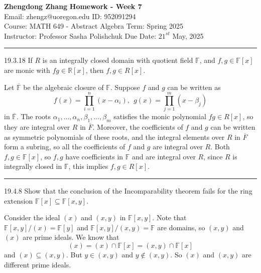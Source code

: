 \documentclass[letterpaper, 12pt]{article}
\begin{document}
\noindent
\large\textbf{Zhengdong Zhang} \hfill \textbf{Homework - Week 7} \\
Email: zhengz@uoregon.edu \hfill ID: 952091294 \\
\normalsize Course: MATH 649 - Abstract Algebra \hfill Term: Spring 2025 \\
Instructor: Professor Sasha Polishchuk \hfill Due Date: $21^{st}$ May, 2025 \\
\noindent\rule{7in}{2.8pt}

\begin{problem}{19.3.18}
If \(R\) is an integrally closed domain with quotient field \(\mathbb{F}\), and \(f,g\in \mathbb{F}[x]\) are monic with \(fg\in \mathbb{R}[x]\), then \(f,g\in R[x]\).
\end{problem}
\begin{solution}
Let \(\overline{\mathbb{F}}\) be the algebraic closure of \(\mathbb{F}\). Suppose \(f\) and \(g\) can be written as 
\[f(x)=\prod_{i=1}^n(x-\alpha_i),\ \ g(x)=\prod_{j=1}^{m}(x-\beta_j)\]
in \(\overline{\mathbb{F}}\). The roots \(\alpha_1,\ldots,\alpha_n,\beta_1,\ldots,\beta_m\) satisfies the monic polynomial \(fg\in R[x]\), so they are integral over \(R\) in \(\overline{F}\). Moreover, the coefficients of \(f\) and \(g\) can be written as symmetric polynomials of these roots, and the integral elements over \(R\) in \(\overline{F}\) form a subring, so all the coefficients of \(f\) and \(g\) are integral over \(R\). Both \(f,g\in \mathbb{F}[x]\), so \(f,g\) have coefficients in \(\mathbb{F}\) and are integral over \(R\), since \(R\) is integrally closed in \(\mathbb{F}\), this implies \(f,g\in R[x]\).
\end{solution}

\noindent\rule{7in}{2.8pt}
\begin{problem}{19.4.8}
Show that the conclusion of the Incomparability  theorem fails for the ring extension \(\mathbb{F}[x]\subseteq \mathbb{F}[x,y]\).
\end{problem}
\begin{solution}
Consider the ideal \((x)\) and \((x,y)\) in \(\mathbb{F}[x,y]\). Note that \(\mathbb{F}[x,y]/(x)=\mathbb{F}[y]\) and \(\mathbb{F}[x,y]/(x,y)=\mathbb{F}\) are domains, so \((x,y)\) and \((x)\) are prime ideals. We know that 
\[(x)=(x)\cap \mathbb{F}[x]=(x,y)\cap \mathbb{F}[x]\]
and \((x)\subseteq (x,y)\). But \(y\in (x,y)\) and \(y\notin (x,y)\). So \((x)\) and \((x,y)\) are different prime ideals.
\end{solution}
\end{document}

